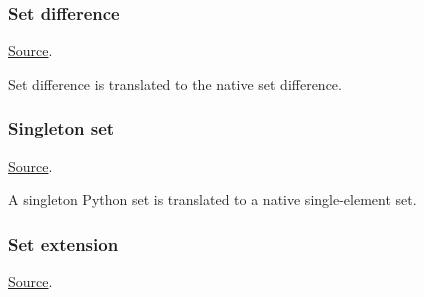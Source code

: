 \subsubsection{Set difference}
\href{https://github.com/saltiniroberto/ssf/blob/7ea6e18093d9da3154b4e396dd435549f687e6b9/high_level/common/pythonic_code_generic.py#L46-L47}{Source}.



\begin{mathpar}
\end{mathpar}
Set difference is translated to the \tlap{} native set difference.

\subsubsection{Singleton set}
\href{https://github.com/saltiniroberto/ssf/blob/7ea6e18093d9da3154b4e396dd435549f687e6b9/high_level/common/pythonic_code_generic.py#L50-L51}{Source}.


\begin{mathpar}
\end{mathpar}
A singleton Python set is translated to a \tlap{} native single-element set.

\subsubsection{Set extension}
\href{https://github.com/saltiniroberto/ssf/blob/7ea6e18093d9da3154b4e396dd435549f687e6b9/high_level/common/pythonic_code_generic.py#L54-L55}{Source}.


